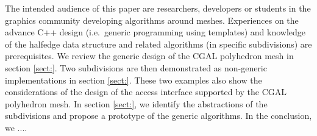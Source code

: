
The intended audience of this paper are researchers, developers or
students in the graphics community developing algorithms around
meshes. Experiences on the advance C++ design (i.e.\ generic
programming using templates) and knowledge of the halfedge data
structure and related algorithms (in specific subdivisions) are
prerequisites.  We review the generic design of the CGAL polyhedron
mesh in section \ref{sect:}. Two subdivisions are then demonstrated as
non-generic implementations in section \ref{sect:}.  These two
examples also show the considerations of the design of the access
interface supported by the CGAL polyhedron mesh. In section
\ref{sect:}, we identify the abstractions of the subdivisions and
propose a prototype of the generic algorithms. In the conclusion, we
....







